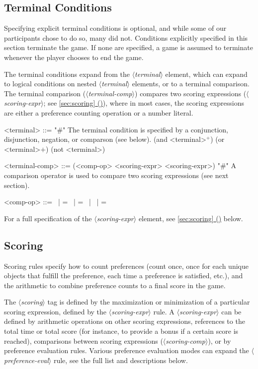\documentclass{article}
\newcommand{\dsl}[1]{{\it $\langle$#1$\rangle$}}
\newcommand*{\fullref}[1]{\hyperref[{#1}]{\autoref*{#1} (\nameref*{#1})}} %
\begin{document}
\subsection{Terminal Conditions} \label{sec:terminal}
Specifying explicit terminal conditions is optional, and while some of our participants chose to do so, many did not.
Conditions explicitly specified in this section terminate the game.
If none are specified, a game is assumed to terminate whenever the player chooses to end the game.

The terminal conditions expand from the \dsl{terminal} element, which can expand to logical conditions on nested \dsl{terminal} elements, or to a terminal comparison.
The terminal comparison (\dsl{terminal-comp}) compares two scoring expressions (\dsl{scoring-expr}; see \fullref{sec:scoring}), where in most cases, the scoring expressions are either a preference counting operation or a number literal.

\begin{grammar}
<terminal> ::= "#" The terminal condition is specified by a conjunction, disjunction, negation, or comparson (see below).
        \alt (and <terminal>$^+$)
        \alt (or <terminal>$+$)
        \alt (not <terminal>)

<terminal-comp> ::= (<comp-op> <scoring-expr> <scoring-expr>) "#" A comparison operator is used to compare two scoring expressions (see next section).

    <comp-op> ::=  \textlangle \ | \textlangle = \ | = \ | \textrangle \ | \textrangle =



\end{grammar}
For a full specification of the \dsl{scoring-expr} element, see \fullref{sec:scoring} below.



\subsection{Scoring} \label{sec:scoring}
Scoring rules specify how to count preferences (count once, once for each unique objects that fulfill the preference, each time a preference is satisfied, etc.), and the arithmetic to combine preference counts to a final score in the game.

The \dsl{scoring} tag is defined by the maximization or minimization of a particular scoring expression, defined by the \dsl{scoring-expr} rule.
A \dsl{scoring-expr} can be defined by arithmetic operations on other scoring expressions, references to the total time or total score (for instance, to provide a bonus if a certain score is reached), comparisons between scoring expressions (\dsl{scoring-comp}), or by preference evaluation rules.
Various preference evaluation modes can expand the \dsl{preference-eval} rule, see the full list and descriptions below.
\end{document}
